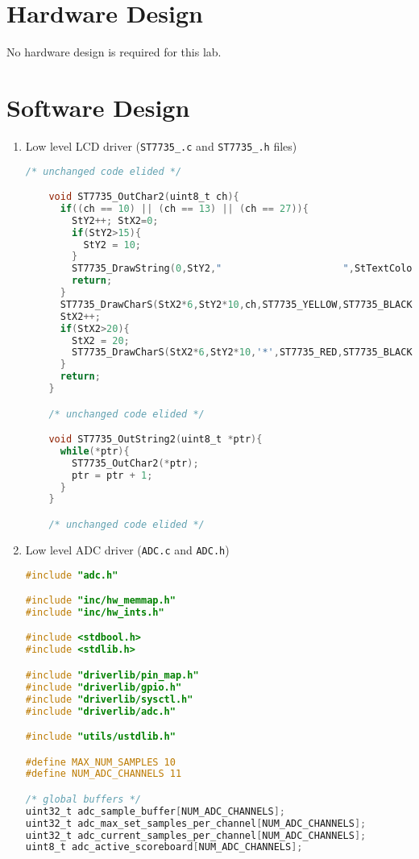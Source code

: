 \documentclass[12pt]{article}
\begin{document}
\section{Hardware Design}
No hardware design is required for this lab.
\section{Software Design}
\begin{enumerate}[1)]
\item Low level LCD driver (\verb|ST7735_.c| and \verb|ST7735_.h|
  files) \\

  \begin{lstlisting}[language=C]
    /* unchanged code elided */

    void ST7735_OutChar2(uint8_t ch){
      if((ch == 10) || (ch == 13) || (ch == 27)){
        StY2++; StX2=0;
        if(StY2>15){
          StY2 = 10;
        }
        ST7735_DrawString(0,StY2,"                     ",StTextColor);
        return;
      }
      ST7735_DrawCharS(StX2*6,StY2*10,ch,ST7735_YELLOW,ST7735_BLACK, 1);
      StX2++;
      if(StX2>20){
        StX2 = 20;
        ST7735_DrawCharS(StX2*6,StY2*10,'*',ST7735_RED,ST7735_BLACK, 1);
      }
      return;
    }

    /* unchanged code elided */

    void ST7735_OutString2(uint8_t *ptr){
      while(*ptr){
        ST7735_OutChar2(*ptr);
        ptr = ptr + 1;
      }
    }

    /* unchanged code elided */
  \end{lstlisting}
\item Low level ADC driver (\verb|ADC.c| and \verb|ADC.h|) \\
  \begin{lstlisting}[language=C]
    #include "adc.h"

#include "inc/hw_memmap.h"
#include "inc/hw_ints.h"

#include <stdbool.h>
#include <stdlib.h>

#include "driverlib/pin_map.h"
#include "driverlib/gpio.h"
#include "driverlib/sysctl.h"
#include "driverlib/adc.h"

#include "utils/ustdlib.h"

#define MAX_NUM_SAMPLES 10
#define NUM_ADC_CHANNELS 11

/* global buffers */
uint32_t adc_sample_buffer[NUM_ADC_CHANNELS];
uint32_t adc_max_set_samples_per_channel[NUM_ADC_CHANNELS];
uint32_t adc_current_samples_per_channel[NUM_ADC_CHANNELS];
uint8_t adc_active_scoreboard[NUM_ADC_CHANNELS];


\end{lstlisting}
\end{enumerate}
\end{document}
